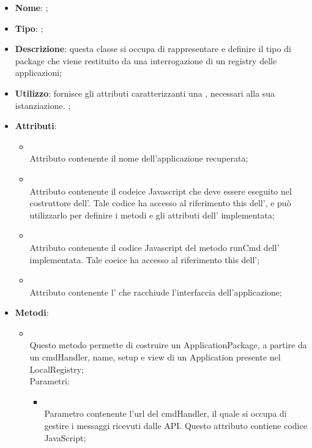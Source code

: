 \begin{itemize}
	\item \textbf{Nome}: ;
	\item \textbf{Tipo}: ;
	\item \textbf{Descrizione}: questa classe si occupa di rappresentare e definire il tipo di package che viene restituito da una interrogazione di un registry delle applicazioni;
	\item \textbf{Utilizzo}: fornisce gli attributi caratterizzanti una , necessari alla sua istanziazione. ;
	\item \textbf{Attributi}:
	\begin{itemize}
		\item[]  \\
		Attributo contenente il nome dell'applicazione recuperata;
		\item[]  \\
		Attributo contenente il codeice Javascript che deve essere eseguito nel costruttore dell'. Tale codice ha accesso al riferimento this dell', e può utilizzarlo per definire i metodi e gli attributi dell' implementata;
		\item[]  \\
		Attributo contenente il codice Javascript del metodo runCmd dell' implementata. Tale coeice ha accesso al riferimento this dell';
		\item[]  \\
		Attributo contenente l' che racchiude l'interfaccia dell'applicazione;
	\end{itemize}
	\item \textbf{Metodi}:
	\begin{itemize}
		\item[]  \\
		Questo metodo permette di costruire un ApplicationPackage, a partire da un cmdHandler, name, setup e view di un Application presente nel LocalRegistry;\\
		Parametri:
		\begin{itemize}
			\item {} \\
			Parametro contenente l'url del cmdHandler, il quale si occupa di gestire i messaggi ricevuti dalle API. Questo attributo contiene codice JavaScript;

\end{itemize}
\end{itemize}
\end{itemize}
